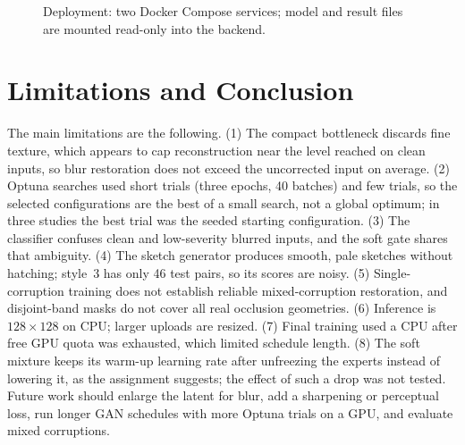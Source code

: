 \documentclass[conference]{IEEEtran}
\begin{document}
\begin{figure}[!ht]\centering
{}\caption{Deployment: two Docker Compose services; model and result files are mounted read-only into the backend.}\end{figure}

\section{Limitations and Conclusion}
The main limitations are the following. (1) The compact bottleneck discards
fine texture, which appears to cap reconstruction near the level reached on clean inputs,
so blur restoration does not exceed the uncorrected input on average.
(2) Optuna searches used short trials (three epochs, 40 batches) and few trials,
so the selected configurations are the best of a small search, not a global
optimum; in three studies the best trial was the seeded starting configuration.
(3) The classifier confuses clean and low-severity blurred inputs, and the soft
gate shares that ambiguity. (4) The sketch generator produces smooth, pale
sketches without hatching; style~3 has only 46 test pairs, so its scores are
noisy. (5) Single-corruption training does not establish reliable
mixed-corruption restoration, and disjoint-band masks do not cover all real
occlusion geometries. (6) Inference is $128\times128$ on CPU; larger uploads are
resized. (7) Final training used a CPU after free GPU quota was exhausted, which
limited schedule length. (8) The soft mixture keeps its warm-up learning rate
after unfreezing the experts instead of lowering it, as the assignment suggests;
the effect of such a drop was not tested.
Future work should enlarge the latent for blur, add a sharpening or perceptual
loss, run longer GAN schedules with more Optuna trials on a GPU, and evaluate
mixed corruptions.
\end{document}
